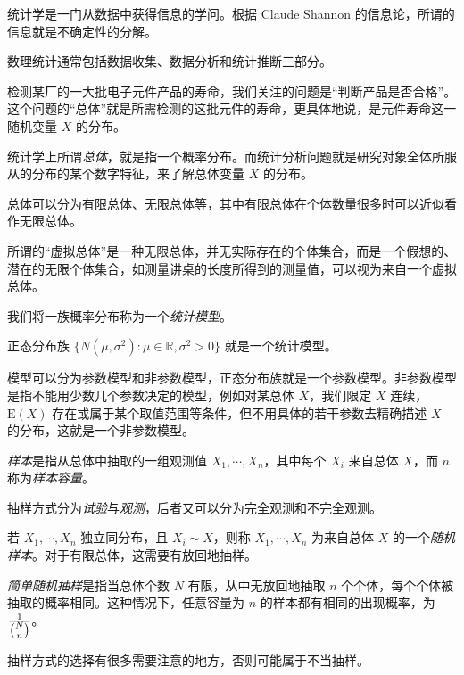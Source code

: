 \documentclass[../main.tex]{subfiles}
\begin{document}
统计学是一门从数据中获得信息的学问。根据 Claude Shannon 的信息论，所谓的信息就是不确定性的分解。

数理统计通常包括数据收集、数据分析和统计推断三部分。


\begin{example}
    检测某厂的一大批电子元件产品的寿命，我们关注的问题是“判断产品是否合格”。这个问题的“总体”就是所需检测的这批元件的寿命，更具体地说，是元件寿命这一随机变量 $X$ 的分布。
\end{example}

统计学上所谓\emph{总体}，就是指一个概率分布。而统计分析问题就是研究对象全体所服从的分布的某个数字特征，来了解总体变量 $X$ 的分布。

总体可以分为有限总体、无限总体等，其中有限总体在个体数量很多时可以近似看作无限总体。

所谓的“虚拟总体”是一种无限总体，并无实际存在的个体集合，而是一个假想的、潜在的无限个体集合，如测量讲桌的长度所得到的测量值，可以视为来自一个虚拟总体。

我们将一族概率分布称为一个\emph{统计模型}。

\begin{example}
    正态分布族 $\{N(\mu,\sigma^2):\mu\in\mathbb R,\sigma^2>0\}$ 就是一个统计模型。
\end{example}

模型可以分为参数模型和非参数模型，正态分布族就是一个参数模型。非参数模型是指不能用少数几个参数决定的模型，例如对某总体 $X$，我们限定 $X$ 连续，$\mathrm E(X)$ 存在或属于某个取值范围等条件，但不用具体的若干参数去精确描述 $X$ 的分布，这就是一个非参数模型。

\emph{样本}是指从总体中抽取的一组观测值 $X_1,\cdots,X_n$，其中每个 $X_i$ 来自总体 $X$，而 $n$ 称为\emph{样本容量}。

抽样方式分为\emph{试验}与\emph{观测}，后者又可以分为完全观测和不完全观测。


若 $X_1,\cdots,X_n$ 独立同分布，且 $X_i\sim X$，则称 $X_1,\cdots,X_n$ 为来自总体 $X$ 的一个\emph{随机样本}。对于有限总体，这需要有放回地抽样。

\emph{简单随机抽样}是指当总体个数 $N$ 有限，从中无放回地抽取 $n$ 个个体，每个个体被抽取的概率相同。这种情况下，任意容量为 $n$ 的样本都有相同的出现概率，为 $\frac1{\tbinom Nn}$。

抽样方式的选择有很多需要注意的地方，否则可能属于不当抽样。
\end{document}

